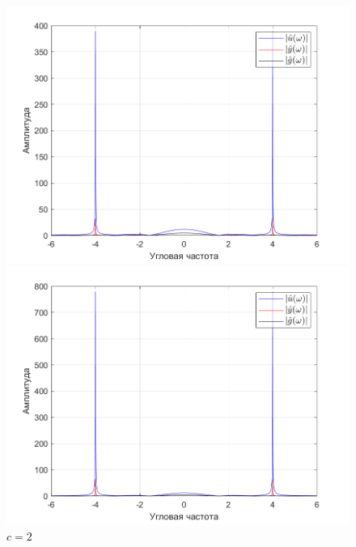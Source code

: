 \documentclass[a4paper]{article}
\begin{document}
\begin{figure}[H]
    \begin{minipage}{0.5\textwidth}
        \centering
        \includegraphics[width=\linewidth]{ex1_2/a1=0_a2=25_b1=10.5_b2=25_d=4_c=1/h4.png}
        \caption{$c=1$}
    \end{minipage}
    \begin{minipage}{0.5\textwidth}
        \centering
        \includegraphics[width=\linewidth]{ex1_2/a1=0_a2=25_b1=10.5_b2=25_d=4_c=2/h4.png}
        \caption{$c=2$}
    \end{minipage}
\end{figure}
\end{document}
